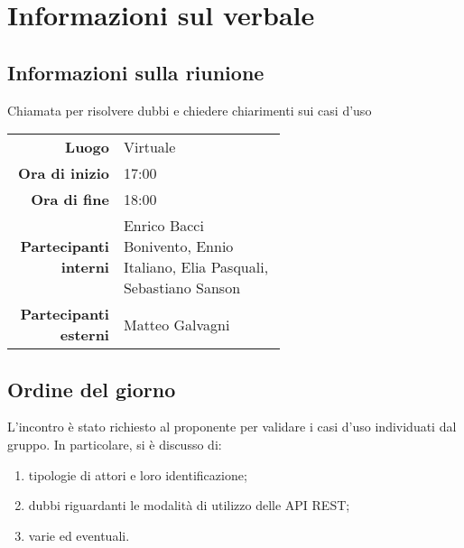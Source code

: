 \section{Informazioni sul verbale}

\subsection{Informazioni sulla riunione}
Chiamata per risolvere dubbi e chiedere chiarimenti sui casi d'uso

\begin{center}
	\begin{tabular}{r|p{0.6\linewidth}}
		\toprule
		\textbf{Luogo} & Virtuale \\
		\textbf{Ora di inizio} & 17:00 \\
		\textbf{Ora di fine} & 18:00 \\
		\textbf{Partecipanti interni} & Enrico Bacci Bonivento, Ennio Italiano, Elia Pasquali, Sebastiano Sanson \\
		\textbf{Partecipanti esterni} & Matteo Galvagni
	\end{tabular}
\end{center}

\medskip

\subsection{Ordine del giorno}

L'incontro è stato richiesto al proponente per validare i casi d'uso individuati dal gruppo. In particolare, si è discusso di:

\begin{enumerate}
	\item tipologie di attori e loro identificazione;
	\item dubbi riguardanti le modalità di utilizzo delle API REST;
	\item varie ed eventuali.
\end{enumerate}
